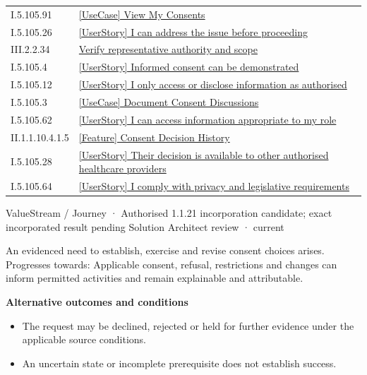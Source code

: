 \begin{longtable}{p{.22\linewidth}p{.73\linewidth}}
I.5.105.91 & \hyperref[element:edeff1758aa8415ea81b94c201b2c5ce]{[UseCase] View My Consents} \\
I.5.105.26 & \hyperref[element:ee3d1b1d76c144f5816717e973773cc0]{[UserStory] I can address the issue before proceeding} \\
III.2.2.34 & \hyperref[element:ee60990709724506905c5dbe8e21261a]{Verify representative authority and scope} \\
I.5.105.4 & \hyperref[element:f2d67cfcaa3440568aa1833239c8f531]{[UserStory] Informed consent can be demonstrated} \\
I.5.105.12 & \hyperref[element:f5b0f7baa84a464ca57e051a08114db6]{[UserStory] I only access or disclose information as authorised} \\
I.5.105.3 & \hyperref[element:f9dd65d57d9f4d4984ebe2f4f85c56b7]{[UseCase] Document Consent Discussions} \\
I.5.105.62 & \hyperref[element:fb7c0249aa7345cb950755a96ce14c2f]{[UserStory] I can access information appropriate to my role} \\
II.1.1.10.4.1.5 & \hyperref[element:fde94ec674194fdd83ebda1366b2dc4f]{[Feature] Consent Decision History} \\
I.5.105.28 & \hyperref[element:ff96ccfd199a422cbd5c2a653cb3e4b7]{[UserStory] Their decision is available to other authorised healthcare providers} \\
I.5.105.64 & \hyperref[element:ffe7377dabdf4d97931fd50230827c58]{[UserStory] I comply with privacy and legislative requirements} \\
\end{longtable}
\label{element:850bba32295c4e53b20036b80f77f491}
{\small ValueStream / Journey · Authorised 1.1.21 incorporation candidate; exact incorporated result pending Solution Architect review · current}\par

An evidenced need to establish, exercise and revise consent choices arises. Progresses towards: Applicable consent, refusal, restrictions and changes can inform permitted activities and remain explainable and attributable.



\par\medskip\textbf{Alternative outcomes and conditions}\par


\begin{itemize}


\item The request may be declined, rejected or held for further evidence under the applicable source conditions.

\item An uncertain state or incomplete prerequisite does not establish success.

\end{itemize}


